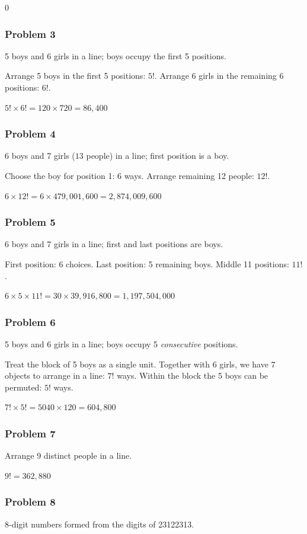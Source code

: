 $\boxed{0}$

\subsubsection*{Problem 3}
5 boys and 6 girls in a line; boys occupy the first 5 positions.

Arrange 5 boys in the first 5 positions: $5!$.
Arrange 6 girls in the remaining 6 positions: $6!$.

$\boxed{5! \times 6! = 120 \times 720 = 86{,}400}$

\subsubsection*{Problem 4}
6 boys and 7 girls ($13$ people) in a line; first position is a boy.

Choose the boy for position 1: 6 ways. Arrange remaining 12 people: $12!$.

$\boxed{6 \times 12! = 6 \times 479{,}001{,}600 = 2{,}874{,}009{,}600}$

\subsubsection*{Problem 5}
6 boys and 7 girls in a line; first and last positions are boys.

First position: 6 choices. Last position: 5 remaining boys. Middle 11 positions: $11!$.

$\boxed{6 \times 5 \times 11! = 30 \times 39{,}916{,}800 = 1{,}197{,}504{,}000}$

\subsubsection*{Problem 6}
5 boys and 6 girls in a line; boys occupy 5 \emph{consecutive} positions.

Treat the block of 5 boys as a single unit. Together with 6 girls, we have 7 objects to arrange in a line: $7!$ ways. Within the block the 5 boys can be permuted: $5!$ ways.

$\boxed{7! \times 5! = 5040 \times 120 = 604{,}800}$

\subsubsection*{Problem 7}
Arrange 9 distinct people in a line.

$\boxed{9! = 362{,}880}$

\subsubsection*{Problem 8}
8-digit numbers formed from the digits of 23122313.

